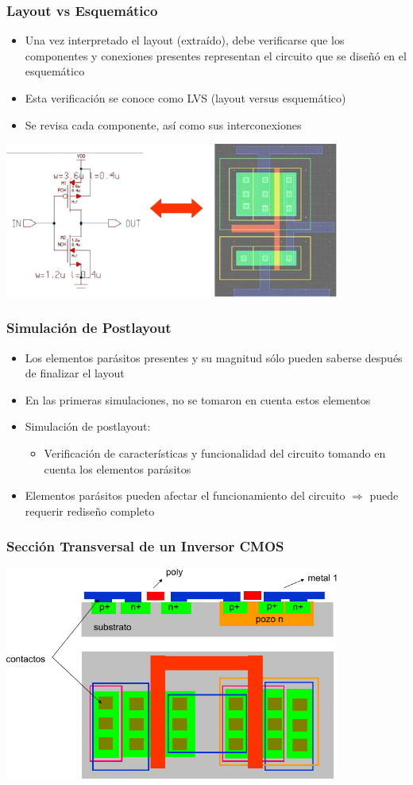 \documentclass[aspectratio=169,10pt]{beamer}
\begin{document}
\begin{frame}[t]
\frametitle{Layout vs Esquemático}
\begin{itemize}
\item Una vez interpretado el layout (extraído), debe verificarse que los componentes y conexiones presentes representan el circuito que se diseñó en el esquemático
\item Esta verificación se conoce como LVS (layout versus esquemático)
\item Se revisa cada componente, así como sus interconexiones
\end{itemize}

\centering
\includegraphics[width=11cm]{LVS}
\end{frame}



\begin{frame}[t]
\frametitle{Simulación de Postlayout}
\begin{itemize}
\item Los elementos parásitos presentes y su magnitud sólo pueden saberse después de finalizar el layout
\item En las primeras simulaciones, no se tomaron en cuenta estos elementos
\item Simulación de postlayout:
\begin{itemize}
	\item Verificación de características y funcionalidad del circuito tomando en cuenta los elementos parásitos
\end{itemize}
\item Elementos parásitos pueden afectar el funcionamiento del circuito $\Rightarrow$ puede requerir rediseño completo
\end{itemize}
\end{frame}



\begin{frame}[t]
\frametitle{Sección Transversal de un Inversor CMOS}
\centering
\includegraphics[width=11cm]{CMOSa}
\end{frame}
\end{document}

